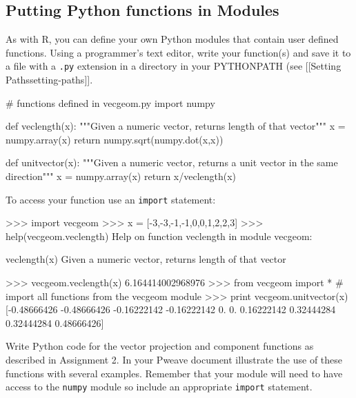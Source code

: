 \subsection{Putting Python functions in Modules}

As with R, you can define your own Python modules that contain user
defined functions. Using a programmer's text editor, write your
function(s) and save it to a file with a \lstinline!.py! extension in a
directory in your PYTHONPATH (see {[}{[}Setting
Paths\textbar{}setting-paths{]}{]}.

\begin{python}
# functions defined in vecgeom.py
import numpy

def veclength(x):
    """Given a numeric vector, returns length of that vector""" 
    x = numpy.array(x)
    return numpy.sqrt(numpy.dot(x,x))


def unitvector(x):
    """Given a numeric vector, returns a unit vector in the same direction"""
    x = numpy.array(x)
    return x/veclength(x)
\end{python}
%
To access your function use an \lstinline!import! statement:
%
\begin{python}
>>> import vecgeom
>>> x = [-3,-3,-1,-1,0,0,1,2,2,3]
>>> help(vecgeom.veclength)
Help on function veclength in module vecgeom:

veclength(x)
    Given a numeric vector, returns length of that vector

>>> vecgeom.veclength(x)
6.164414002968976
>>> from vecgeom import * # import all functions from the vecgeom module
>>> print vecgeom.unitvector(x)
[-0.48666426 -0.48666426 -0.16222142 -0.16222142  0.          0.   
     0.16222142  0.32444284  0.32444284  0.48666426]
\end{python}

\begin{assignment}
Write Python code for the vector projection and
component functions as described in Assignment 2. In your Pweave
document illustrate the use of these functions with several examples.
Remember that your module will need to have access to the
\lstinline!numpy! module so include an appropriate \lstinline!import!
statement.
\end{assignment}
